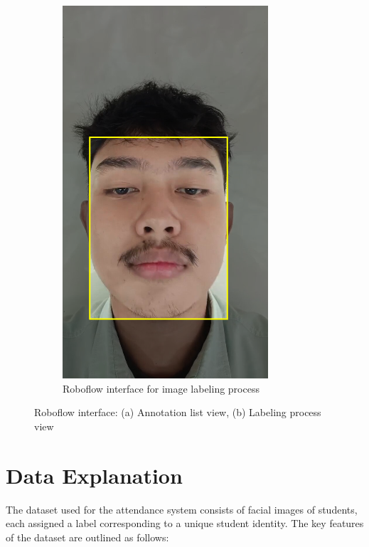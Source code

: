 \begin{figure}[h!]
\begin{subfigure}[b]{0.35\textwidth}
        \includegraphics[width=\textwidth]{images/labeling process.png}
        \caption{Roboflow interface for image labeling process}
        \label{fig:roboflow_process}
    \end{subfigure}
    \caption{Roboflow interface: (a) Annotation list view, (b) Labeling process view}
    \label{fig:roboflow_combined}
\end{figure}

\section{Data Explanation}
The dataset used for the attendance system consists of facial images of students, each assigned a label corresponding to a unique student identity. The key features of the dataset are outlined as follows:
